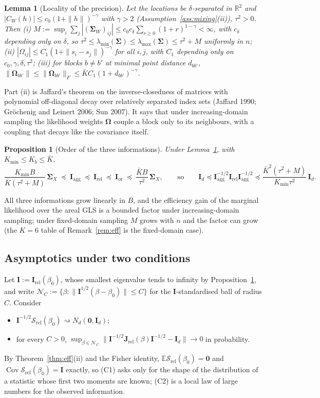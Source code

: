 \documentclass[11pt]{article}
\newtheorem{lemma}{Lemma}
\newtheorem{proposition}{Proposition}
\theoremstyle{definition}
\newcommand{\bI}{\mathbf{I}}
\newcommand{\bzero}{\mathbf{0}}
\newcommand{\bSig}{\boldsymbol{\Sigma}}
\newcommand{\bOm}{\boldsymbol{\Omega}}
\newcommand{\E}{\mathbb{E}}
\newcommand{\Cov}{\operatorname{Cov}}
\newcommand{\rel}{\mathrm{rel}}
\newcommand{\agg}{\mathrm{agg}}
\newcommand{\orc}{\mathrm{or}}
\begin{document}
\begin{lemma}[Locality of the precision]\label{lem:decay}
Let the locations be $\delta$-separated in $\mathbb R^2$ and $|C_W(h)|\le c_0(1+\|h\|)^{-\gamma}$ with $\gamma>2$ (Assumption~\ref{ass:mixing}(ii)), $\tau^2>0$. Then
(i) $M:=\sup_i\sum_j|(\bSig_W)_{ij}|\le c_0c_\delta\sum_{r\ge0}(1+r)^{1-\gamma}<\infty$, with $c_\delta$ depending only on $\delta$, so $\tau^2\le\lambda_{\min}(\bSig)\le\lambda_{\max}(\bSig)\le\tau^2+M$ uniformly in $n$;
(ii) $|\Omega_{ij}|\le C_1(1+\|s_i-s_j\|)^{-\gamma}$ for all $i,j$, with $C_1$ depending only on $c_0,\gamma,\delta,\tau^2$;
(iii) for blocks $b\ne b'$ at minimal point distance $d_{bb'}$, $\|\bOm_{bb'}\|\le\|\bOm_{bb'}\|_F\le\bar KC_1(1+d_{bb'})^{-\gamma}$.
\end{lemma}
Part (ii) is Jaffard's theorem on the inverse-closedness of matrices with polynomial off-diagonal decay over relatively separated index sets (Jaffard 1990; Gr\"ochenig and Leinert 2006; Sun 2007). It says that under increasing-domain sampling the likelihood weights $\bOm$ couple a block only to its neighbours, with a coupling that decays like the covariance itself.

\begin{proposition}[Order of the three informations]\label{prop:order}
Under Lemma~\ref{lem:decay}, with $K_{\min}\le K_b\le\bar K$,
\[
\frac{K_{\min}B}{\bar K(\tau^2+M)}\,\bSig_X\ \preceq\ \mathbf I_\agg\ \preceq\ \mathbf I_\rel\ \preceq\ \mathbf I_\orc\ \preceq\ \frac{\bar KB}{\tau^2}\,\bSig_X,
\qquad\text{so}\qquad \bI_d\preceq\mathbf I_\agg^{-1/2}\mathbf I_\rel\mathbf I_\agg^{-1/2}\preceq\frac{\bar K^2(\tau^2+M)}{K_{\min}\tau^2}\,\bI_d .
\]
\end{proposition}
All three informations grow linearly in $B$, and the efficiency gain of the marginal likelihood over the areal GLS is a bounded factor under increasing-domain sampling; under fixed-domain sampling $M$ grows with $n$ and the factor can grow (the $K=6$ table of Remark~\ref{rem:eff} is the fixed-domain case).

\subsection{Asymptotics under two conditions}
Let $\mathbf I:=\mathbf I_\rel(\beta_0)$, whose smallest eigenvalue tends to infinity by Proposition~\ref{prop:order}, and write $\mathcal N_C:=\{\beta:\|\mathbf I^{1/2}(\beta-\beta_0)\|\le C\}$ for the $\mathbf I$-standardised ball of radius $C$. Consider
\begin{itemize}
\item[(C1)] $\mathbf I^{-1/2}\bm{\mathcal S}_\rel(\beta_0)\rightsquigarrow N_d(\bzero,\bI_d)$;
\item[(C2)] for every $C>0$, $\sup_{\beta\in\mathcal N_C}\|\mathbf I^{-1/2}\mathbf J_\rel(\beta)\mathbf I^{-1/2}-\bI_d\|\to0$ in probability.
\end{itemize}
By Theorem~\ref{thm:eff}(ii) and the Fisher identity, $\E\bm{\mathcal S}_\rel(\beta_0)=\bzero$ and $\Cov\bm{\mathcal S}_\rel(\beta_0)=\mathbf I$ exactly, so (C1) asks only for the shape of the distribution of a statistic whose first two moments are known; (C2) is a local law of large numbers for the observed information.
\end{document}
